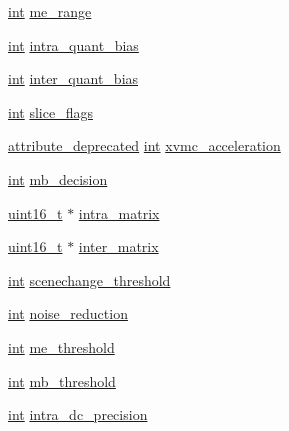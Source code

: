 \begin{DoxyCompactItemize}
\hyperlink{xmltok_8h_a5a0d4a5641ce434f1d23533f2b2e6653}{int} \hyperlink{struct_a_v_codec_context_ad16d78b369781e09d14343788284300a}{me\+\_\+range}
\item 
\hyperlink{xmltok_8h_a5a0d4a5641ce434f1d23533f2b2e6653}{int} \hyperlink{struct_a_v_codec_context_acb4a8098f06ceed349a7a9f2eb1c4ee1}{intra\+\_\+quant\+\_\+bias}
\item 
\hyperlink{xmltok_8h_a5a0d4a5641ce434f1d23533f2b2e6653}{int} \hyperlink{struct_a_v_codec_context_a07a0b83c4bf22c652b494759e6385867}{inter\+\_\+quant\+\_\+bias}
\item 
\hyperlink{xmltok_8h_a5a0d4a5641ce434f1d23533f2b2e6653}{int} \hyperlink{struct_a_v_codec_context_a2ce5f24ee2312281a68b40428b384bc8}{slice\+\_\+flags}
\item 
\hyperlink{attributes_8h_aa6d076561d3a9eea4729ee632652de02}{attribute\+\_\+deprecated} \hyperlink{xmltok_8h_a5a0d4a5641ce434f1d23533f2b2e6653}{int} \hyperlink{struct_a_v_codec_context_a358503f8848e8a496fc3de96ba62643a}{xvmc\+\_\+acceleration}
\item 
\hyperlink{xmltok_8h_a5a0d4a5641ce434f1d23533f2b2e6653}{int} \hyperlink{struct_a_v_codec_context_a66af0e26734255f1eacabd7d67558482}{mb\+\_\+decision}
\item 
\hyperlink{lib-src_2ffmpeg_2win32_2stdint_8h_a30af71eaf40c925c9832eb289a48da35}{uint16\+\_\+t} $\ast$ \hyperlink{struct_a_v_codec_context_ab2c2db3596802edecafa24e494b33879}{intra\+\_\+matrix}
\item 
\hyperlink{lib-src_2ffmpeg_2win32_2stdint_8h_a30af71eaf40c925c9832eb289a48da35}{uint16\+\_\+t} $\ast$ \hyperlink{struct_a_v_codec_context_a5eab2273bf713aca6284b8ba06ead659}{inter\+\_\+matrix}
\item 
\hyperlink{xmltok_8h_a5a0d4a5641ce434f1d23533f2b2e6653}{int} \hyperlink{struct_a_v_codec_context_a5a01e9774060c41493c97d43b9737061}{scenechange\+\_\+threshold}
\item 
\hyperlink{xmltok_8h_a5a0d4a5641ce434f1d23533f2b2e6653}{int} \hyperlink{struct_a_v_codec_context_a04065050e4f8f9b6ca6a302b4a857bbf}{noise\+\_\+reduction}
\item 
\hyperlink{xmltok_8h_a5a0d4a5641ce434f1d23533f2b2e6653}{int} \hyperlink{struct_a_v_codec_context_aa7c2d0cc22f31003bef8a472aa70fd7f}{me\+\_\+threshold}
\item 
\hyperlink{xmltok_8h_a5a0d4a5641ce434f1d23533f2b2e6653}{int} \hyperlink{struct_a_v_codec_context_a3bacd97ea1b5f7c449ebb06ed526f2c9}{mb\+\_\+threshold}
\item 
\hyperlink{xmltok_8h_a5a0d4a5641ce434f1d23533f2b2e6653}{int} \hyperlink{struct_a_v_codec_context_ac5c1b3cd296d19d7492e554d987d00e7}{intra\+\_\+dc\+\_\+precision}

\end{DoxyCompactItemize}
